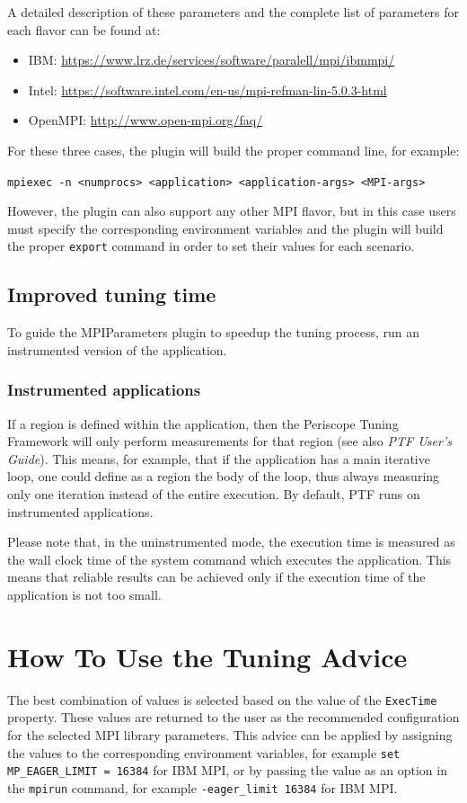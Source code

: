 \documentclass[11pt,a4paper, oneside]{book} %
\begin{document}
A detailed description of these parameters and the complete list of parameters for each flavor can be found at:

\begin{itemize}
\item IBM: \url{https://www.lrz.de/services/software/paralell/mpi/ibmmpi/}
\item Intel: \url{https://software.intel.com/en-us/mpi-refman-lin-5.0.3-html}
\item OpenMPI: \url{http://www.open-mpi.org/faq/}
\end{itemize}

For these three cases, the plugin will build the proper command line, for example:

{\tt mpiexec -n <numprocs> <application> <application-args> <MPI-args>} 

However, the plugin can also support any other MPI flavor, but in this case users must specify the corresponding environment variables and the plugin will build the proper {\tt export} command in order to set their values for each scenario.

\section{Improved tuning time}
To guide the MPIParameters plugin to speedup the tuning process, run an instrumented version of the application.


\subsection{Instrumented applications}

If a region is defined within the application, then the Periscope Tuning Framework will only perform measurements for that region (see also \textit{PTF User's Guide}).
This means, for example, that if the application has a main iterative loop, one could define as a region the body of the loop, thus always measuring only one iteration instead of the entire execution.
By default, PTF runs on instrumented applications.

Please note that, in the uninstrumented mode, the execution time is measured as the wall clock time of the system command which executes the application. This means that reliable results can be achieved only if the execution time of the application is not too small.


\chapter{How To Use the Tuning Advice}

The best combination of values is selected based on the value of the {\tt ExecTime} property. These values are returned to the user as the recommended
configuration for the selected MPI library parameters. This advice can be applied by assigning the values to the corresponding environment variables, for example {\tt set MP\_EAGER\_LIMIT = 16384} for IBM MPI, or by passing the value as an option in the {\tt mpirun} command, for example {\tt -eager\_limit 16384} for IBM MPI.
\end{document}
